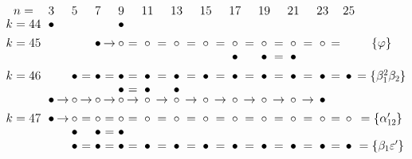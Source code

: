 \documentclass{article}
\begin{document}
\(
\begin{tikzcd}[
nodes={font=\Large,inner sep=0pt},
row sep=0.2cm,
column sep=0.1cm
]
n= && & 3 & & 5 & & 7 & & 9 & & 11 & & 13 & & 15 & & 17 && 19 && 21 && 23 && 25\\
k=44 &&& \bullet && && && \bullet &&  \\ \\
k=45 &&&&& && \bullet &\rightarrow& \circ &=& \circ &=& \circ &=& \circ &=& \circ &=& \circ &=& \circ &=& \circ &=& & \{\varphi\}  \\
& && && && && && && && && \bullet && \bullet &=& \bullet  \\ \\
k=46 &&& && \bullet &=& \bullet &=& \bullet &=& \bullet &=& \bullet  &=& \bullet  &=& \bullet  &=& \bullet &=& \bullet  &=& \bullet  &=& \bullet  & =\{\beta_1^2\beta_2\} \\
 &&& && && && \bullet &=& \bullet && \bullet && \\
&&& \bullet &\rightarrow& \circ &\rightarrow& \circ &\rightarrow& \circ &\rightarrow& \circ &\rightarrow& \circ &\rightarrow& \circ &\rightarrow& \circ &\rightarrow& \circ &\rightarrow& \circ &\rightarrow& \bullet \\ \\ 
k=47 &&& \bullet &\rightarrow& \circ &=& \circ &=& \circ &=& \circ &=& \circ &=& \circ &=& \circ &=& \circ &=& \circ &=& \circ &=& \circ& = \{\alpha'_{12}\} \\
&&& && \bullet && \bullet &=& \bullet && \\
&&& && \bullet &=& \bullet &=& \bullet &=& \bullet &=& \bullet  &=& \bullet  &=& \bullet  &=& \bullet &=& \bullet  &=& \bullet  &=& \bullet  & =\{\beta_1\varepsilon'\} \\
\\
\end{tikzcd}
\)
\end{document}
